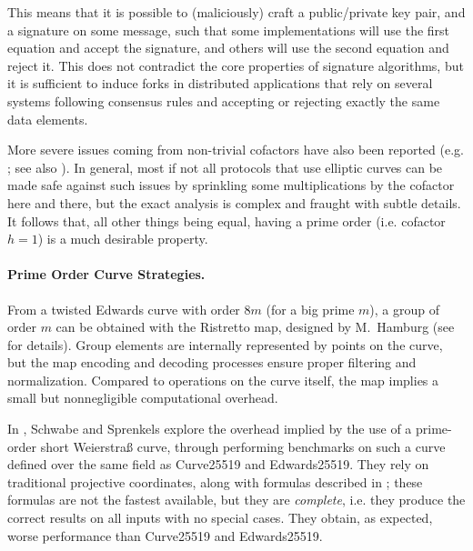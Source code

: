 \documentclass{llncs}
\begin{document}
This means that it is possible to (maliciously) craft a public/private
key pair, and a signature on some message, such that some
implementations will use the first equation and accept the signature,
and others will use the second equation and reject it. This does not
contradict the core properties of signature algorithms, but it is
sufficient to induce forks in distributed applications that rely on
several systems following consensus rules and accepting or rejecting
exactly the same data elements.

More severe issues coming from non-trivial cofactors have also been
reported (e.g. \cite{MoneroBug2017}; see also \cite{CreJac2019}). In
general, most if not all protocols that use elliptic curves can be made
safe against such issues by sprinkling some multiplications by the
cofactor here and there, but the exact analysis is complex and fraught
with subtle details. It follows that, all other things being equal,
having a prime order (i.e. cofactor $h = 1$) is a much desirable
property.

\paragraph{Prime Order Curve Strategies.}

From a twisted Edwards curve with order $8m$ (for a big prime $m$), a
group of order $m$ can be obtained with the Ristretto map, designed by
M.~Hamburg (see~\cite{RistrettoWeb} for details). Group elements are
internally represented by points on the curve, but the map encoding and
decoding processes ensure proper filtering and normalization. Compared
to operations on the curve itself, the map implies a small but
nonnegligible computational overhead.

In \cite{SchSpr2019}, Schwabe and Sprenkels explore the overhead implied
by the use of a prime-order short Weierstraß curve, through performing
benchmarks on such a curve defined over the same field as Curve25519 and
Edwards25519. They rely on traditional projective coordinates, along
with formulas described in \cite{RenCosBat2015}; these formulas are not
the fastest available, but they are \emph{complete}, i.e. they produce
the correct results on all inputs with no special cases. They obtain, as
expected, worse performance than Curve25519 and Edwards25519.
\end{document}
